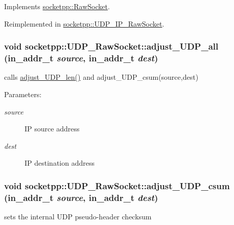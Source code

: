 Implements \hyperlink{classsocketpp_1_1RawSocket_45e6b041703cb8ae0f93dd19766865d5}{socketpp::RawSocket}.

Reimplemented in \hyperlink{classsocketpp_1_1UDP__IP__RawSocket_40fde867fa138b495f660864023a3eb1}{socketpp::UDP\_\-IP\_\-RawSocket}.\hypertarget{classsocketpp_1_1UDP__RawSocket_4fe2e6b184ca8f8248a187df30e12fd2}{
\subsubsection[{adjust\_\-UDP\_\-all}]{\setlength{\rightskip}{0pt plus 5cm}void socketpp::UDP\_\-RawSocket::adjust\_\-UDP\_\-all (in\_\-addr\_\-t {\em source}, \/  in\_\-addr\_\-t {\em dest})}}
\label{classsocketpp_1_1UDP__RawSocket_4fe2e6b184ca8f8248a187df30e12fd2}


calls \hyperlink{classsocketpp_1_1UDP__RawSocket_1caa413cfe4f72d8c0aeccdcb10469b5}{adjust\_\-UDP\_\-len()} and adjust\_\-UDP\_\-csum(source,dest) 

\begin{Desc}
\item[Parameters:]
\begin{description}
\item[{\em source}]IP source address \item[{\em dest}]IP destination address \end{description}
\end{Desc}
\hypertarget{classsocketpp_1_1UDP__RawSocket_8d96a58ee9d39e2c014aa81ded23727a}{
\subsubsection[{adjust\_\-UDP\_\-csum}]{\setlength{\rightskip}{0pt plus 5cm}void socketpp::UDP\_\-RawSocket::adjust\_\-UDP\_\-csum (in\_\-addr\_\-t {\em source}, \/  in\_\-addr\_\-t {\em dest})}}
\label{classsocketpp_1_1UDP__RawSocket_8d96a58ee9d39e2c014aa81ded23727a}


sets the internal UDP pseudo-header checksum 

